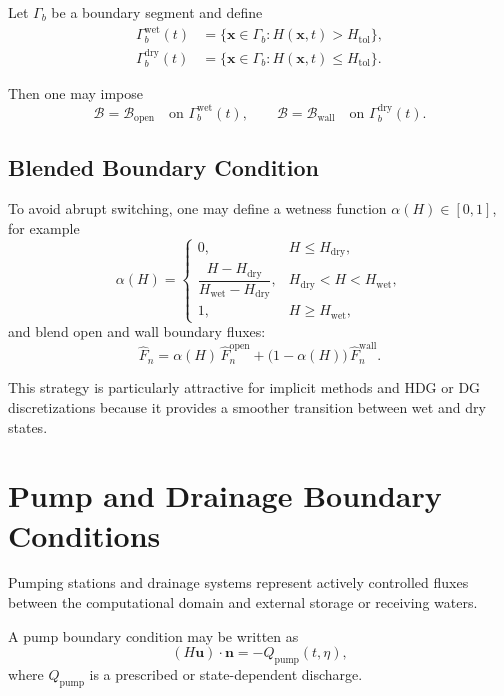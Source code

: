 \documentclass[11pt]{article}
\begin{document}
Let \(\Gamma_b\) be a boundary segment and define
\begin{align}
\Gamma_b^{\mathrm{wet}}(t) &= \{ \bm{x}\in\Gamma_b : H(\bm{x},t)>H_{\mathrm{tol}} \}, \\
\Gamma_b^{\mathrm{dry}}(t) &= \{ \bm{x}\in\Gamma_b : H(\bm{x},t)\le H_{\mathrm{tol}} \}.
\end{align}

Then one may impose
\begin{equation}
\mathcal{B} = \mathcal{B}_{\mathrm{open}}
\quad \text{on } \Gamma_b^{\mathrm{wet}}(t),
\qquad
\mathcal{B} = \mathcal{B}_{\mathrm{wall}}
\quad \text{on } \Gamma_b^{\mathrm{dry}}(t).
\end{equation}

\subsection{Blended Boundary Condition}

To avoid abrupt switching, one may define a wetness function \(\alpha(H)\in[0,1]\), for example
\begin{equation}
\alpha(H)=
\begin{cases}
0, & H\le H_{\mathrm{dry}}, \\[4pt]
\dfrac{H-H_{\mathrm{dry}}}{H_{\mathrm{wet}}-H_{\mathrm{dry}}}, & H_{\mathrm{dry}}<H<H_{\mathrm{wet}}, \\[8pt]
1, & H\ge H_{\mathrm{wet}},
\end{cases}
\end{equation}
and blend open and wall boundary fluxes:
\begin{equation}
\widehat{F}_n
=
\alpha(H)\,\widehat{F}_n^{\mathrm{open}}
+
\bigl(1-\alpha(H)\bigr)\,\widehat{F}_n^{\mathrm{wall}}.
\end{equation}

This strategy is particularly attractive for implicit methods and HDG or DG discretizations because it provides a smoother transition between wet and dry states.

\section{Pump and Drainage Boundary Conditions}

Pumping stations and drainage systems represent actively controlled
fluxes between the computational domain and external storage or
receiving waters.

A pump boundary condition may be written as
\begin{equation}
(H\bm{u})\cdot\bm{n} = -Q_{\mathrm{pump}}(t, \eta),
\end{equation}
where $Q_{\mathrm{pump}}$ is a prescribed or state-dependent discharge.
\end{document}
